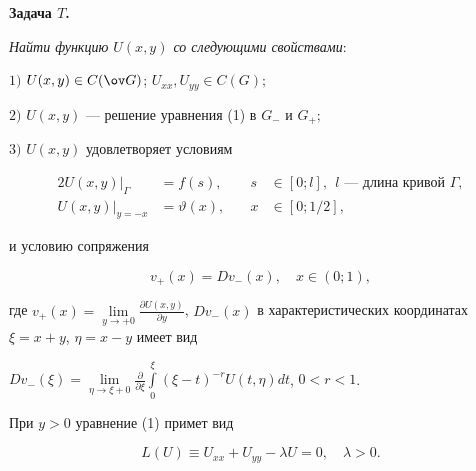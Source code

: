 {\bf Задача $T$.} {\it Найти функцию $U(x,y)$ со следующими свойствами\/${:}$ 


 


$1)$ $U(x,y)\in C(\ov G)$; $U_{xx},U_{yy}\in C(G);$ 


 


$2)$ $U(x,y)$ --- решение уравнения (1) в $G_-$ и $G_+;$ 


 


$3)$ $U(x,y)$ удовлетворяет условиям 


\begin{alignat*}{2} 


U(x,y)|_\Gamma &=f(s),&\quad s&\in[0;l],\ \ 


\text{$l$ --- длина кривой $\Gamma$}, \\ 


% 


U(x,y)|_{y=-x}&=\vartheta(x), &\quad x&\in[0;1/2], 


\end{alignat*} 


и условию сопряжения 


\begin{equation} 


v_+(x)=D v_-(x),\quad x\in(0;1), 


\end{equation} 


где $v_+(x)=\lim\limits_{y\to+0}\frac{\partial U(x,y)}{\partial y}$, $D 


v_-(x)$ в характеристических координатах $\xi=x+y$, $\eta=x-y$ имеет вид 


$D v_-(\xi)=\lim\limits_{\eta\to\xi+0}\frac{\partial}{\partial\xi} 


\int\limits^\xi_0(\xi-t)^{-r}U(t,\eta)dt$, $0<r<1$. 


}


 


При $y>0$ уравнение (1) примет вид 


\begin{equation} 


L(U)\equiv U_{xx}+U_{yy}-\lambda U=0,\quad \lambda>0. 


\end{equation} 


 


